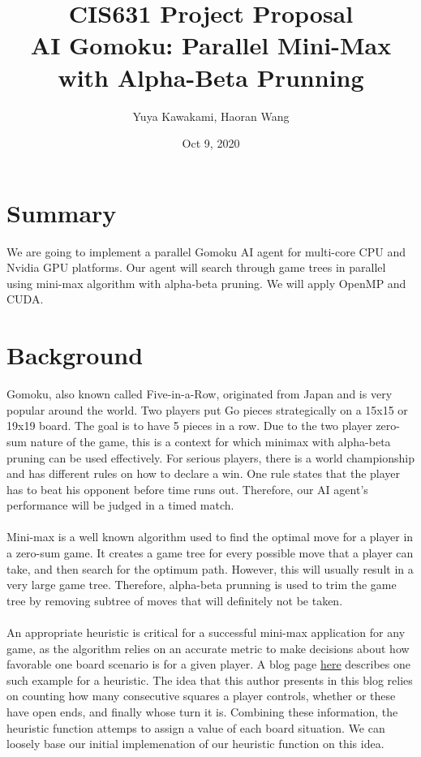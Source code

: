 \documentclass[12pt]{article}
\title{CIS631 Project Proposal \\ AI Gomoku: Parallel Mini-Max with Alpha-Beta Prunning}
\author{Yuya Kawakami, Haoran Wang}
\date{Oct 9, 2020}
\begin{document}
	\maketitle
	

	\section{Summary}
	We are going to implement a parallel Gomoku AI agent for multi-core CPU and Nvidia GPU platforms. Our agent will search through game trees in parallel using mini-max algorithm with alpha-beta pruning. We will apply OpenMP and CUDA. 
	
	
	\section{Background}
	
	Gomoku, also known called Five-in-a-Row, originated from Japan and is very popular around the world. Two players put Go pieces strategically on a 15x15 or 19x19 board. The goal is to have 5 pieces in a row. Due to the two player zero-sum nature of the game, this is a context for which minimax with alpha-beta pruning can be used effectively. For serious players, there is a world championship and has different rules on how to declare a win. One rule states that the player has to beat his opponent before time runs out. Therefore, our AI agent's performance will be judged in a timed match.\\
	\\Mini-max is a well known algorithm used to find the optimal move for a player in a zero-sum game. It creates a game tree for every possible move that a player can take, and then search for the optimum path. However, this will usually result in a very large game tree. Therefore, alpha-beta prunning is used to trim the game tree by removing subtree of moves that will definitely not be taken.\\
	\\
	An appropriate heuristic is critical for a successful mini-max application for any game, as the algorithm relies on an accurate metric to make decisions about how favorable one board scenario is for a given player. A blog page \href{https://blog.theofekfoundation.org/artificial-intelligence/2015/12/11/minimax-for-gomoku-connect-five/}{here} describes one such example for a heuristic. The idea that this author presents in this blog relies on counting how many consecutive
	squares a player controls, whether or these have open ends, and finally whose turn it is. Combining these information, the heuristic function attemps to assign a value of each board situation. We can loosely base our initial implemenation of our heuristic function on this idea.\\
	
\end{document}
